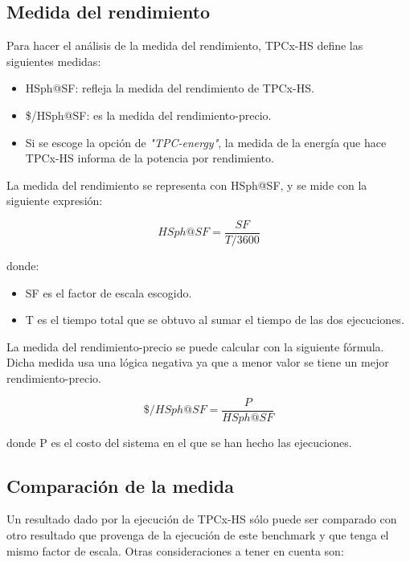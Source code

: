 \documentclass[10pt]{article}
\begin{document}
	\subsection{Medida del rendimiento}
	
		Para hacer el análisis de la medida del rendimiento, TPCx-HS define las siguientes medidas:
		
		\begin{itemize}
			\item HSph@SF: refleja la medida del rendimiento de TPCx-HS.
			\item \$/HSph@SF: es la medida del rendimiento-precio.
			\item Si se escoge la opción de \textit{"TPC-energy"}, la medida de la energía que hace TPCx-HS informa de la potencia por rendimiento. \\
		\end{itemize}
		
		La medida del rendimiento se representa con HSph@SF, y se mide con la siguiente expresión:
		
		$$ HSph@SF = \frac{SF}{T/3600} $$
		
		donde:
		
		\begin{itemize}
			\item SF es el factor de escala escogido.
			\item T es el tiempo total que se obtuvo al sumar el tiempo de las dos ejecuciones. \\
		\end{itemize}	
		
		La medida del rendimiento-precio se puede calcular con la siguiente fórmula. Dicha medida usa una lógica negativa ya que a menor valor se tiene un mejor rendimiento-precio.

		\kern -2mm

		$$ \$/HSph@SF = \frac{P}{HSph@SF} $$

		\kern -2mm
		
		donde P es el costo del sistema en el que se han hecho las ejecuciones.
		
		
		\subsection{Comparación de la medida}
		
		Un resultado dado por la ejecución de TPCx-HS sólo puede ser comparado con otro resultado que provenga de la ejecución de este benchmark y que tenga el mismo factor de escala. Otras consideraciones a tener en cuenta son:
		
\end{document}
